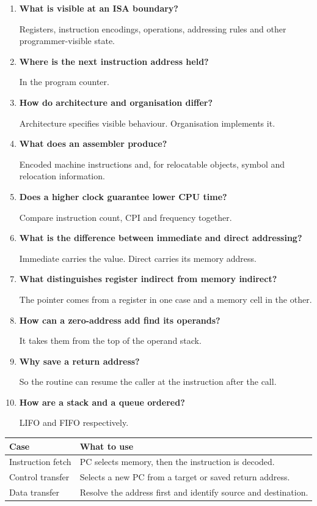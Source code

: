 \documentclass[12pt,a4paper]{article}
\newcommand{\Q}[1]{\textbf{#1}\par\noindent\ignorespaces}
\begin{document}
\begin{tcolorbox}[exambox,title={Frequently Asked / Viva Questions}]
\begin{enumerate}[topsep=0pt, label=\textbf{Q\arabic*.}, itemsep=5pt]
\item \Q{What is visible at an ISA boundary?}
Registers, instruction encodings, operations, addressing rules and other programmer-visible state.
\item \Q{Where is the next instruction address held?}
In the program counter.
\item \Q{How do architecture and organisation differ?}
Architecture specifies visible behaviour. Organisation implements it.
\item \Q{What does an assembler produce?}
Encoded machine instructions and, for relocatable objects, symbol and relocation information.
\item \Q{Does a higher clock guarantee lower CPU time?}
Compare instruction count, CPI and frequency together.
\item \Q{What is the difference between immediate and direct addressing?}
Immediate carries the value. Direct carries its memory address.
\item \Q{What distinguishes register indirect from memory indirect?}
The pointer comes from a register in one case and a memory cell in the other.
\item \Q{How can a zero-address add find its operands?}
It takes them from the top of the operand stack.
\item \Q{Why save a return address?}
So the routine can resume the caller at the instruction after the call.
\item \Q{How are a stack and a queue ordered?}
LIFO and FIFO respectively.
\end{enumerate}
\end{tcolorbox}
\begin{tcolorbox}[tikzbox,title={Summary comparison}]
\begin{tabularx}{\linewidth}{|B{4cm}|Y|}\hline
\textbf{Case} & \textbf{What to use} \\ \hline
Instruction fetch & PC selects memory, then the instruction is decoded. \\ \hline
Control transfer & Selects a new PC from a target or saved return address. \\ \hline
Data transfer & Resolve the address first and identify source and destination. \\ \hline
\end{tabularx}
\end{tcolorbox}
\end{document}
